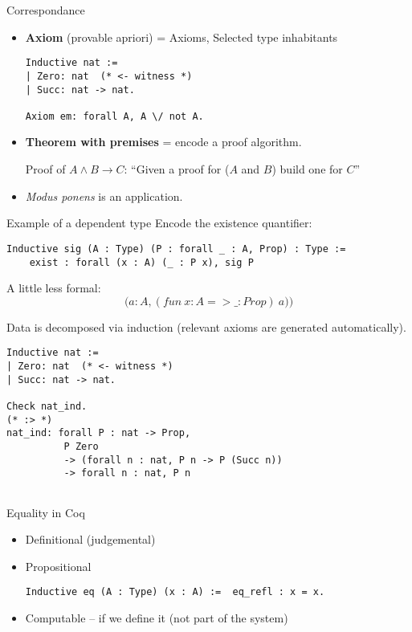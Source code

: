 \documentclass{beamer}
\begin{document}
\begin{frame}[fragile]{Correspondance}
    \begin{itemize}
        \item \textbf{Axiom} (provable apriori) = Axioms, Selected type inhabitants

            \begin{lstlisting}
Inductive nat := 
| Zero: nat  (* <- witness *)
| Succ: nat -> nat.

Axiom em: forall A, A \/ not A.
            \end{lstlisting}

        \item \textbf{Theorem with premises} = encode a proof algorithm.
    
            Proof of $A \land B \rightarrow C$: 
            ``Given a proof for  ($A$ and $B$) build one for $C$''
        \item \textit{Modus ponens} is an application.
    \end{itemize}

\end{frame}

\begin{frame}[fragile]{Example of a dependent type}
    Encode the existence quantifier:
\begin{lstlisting}
Inductive sig (A : Type) (P : forall _ : A, Prop) : Type :=
    exist : forall (x : A) (_ : P x), sig P
\end{lstlisting}

A little less formal:
$$ \bigg( a: A, (fun\ x:A => \_ : Prop) \ a ) \bigg) $$
\end{frame}


\begin{frame}[fragile]
    Data is decomposed via induction (relevant axioms are generated automatically).

\begin{lstlisting}
Inductive nat := 
| Zero: nat  (* <- witness *)
| Succ: nat -> nat.

Check nat_ind.
(* :> *)
nat_ind: forall P : nat -> Prop,
          P Zero 
          -> (forall n : nat, P n -> P (Succ n)) 
          -> forall n : nat, P n
          
\end{lstlisting}
\end{frame}


\begin{frame}[fragile]{Equality in Coq}

\begin{itemize}
    \item Definitional (judgemental)
    \item Propositional
\begin{lstlisting}
Inductive eq (A : Type) (x : A) :=  eq_refl : x = x.
\end{lstlisting}
    \item Computable -- if we define it (not part of the system)
\end{itemize}
\end{frame}
\end{document}
